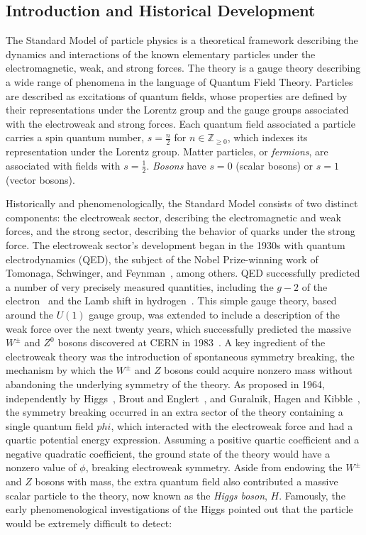 \subsection{Introduction and Historical Development}
The Standard Model of particle physics is a theoretical framework describing the dynamics and interactions of the known elementary particles under the electromagnetic, weak, and strong forces. The theory is a gauge theory describing a wide range of phenomena in the language of Quantum Field Theory. Particles are described as excitations of quantum fields, whose properties are defined by their representations under the Lorentz group and the gauge groups associated with the electroweak and strong forces. Each quantum field associated a particle carries a spin quantum number, $s=\frac{n}{2}$ for $n\in \mathbb{Z}_{\geq0}$, which indexes its representation under the Lorentz group. Matter particles, or \emph{fermions}, are associated with fields with $s=\frac12$. \emph{Bosons} have $s=0$ (scalar bosons) or $s=1$ (vector bosons). 


Historically and phenomenologically, the Standard Model consists of two distinct components: the electroweak sector, describing the electromagnetic and weak forces, and the strong sector, describing the behavior of quarks under the strong force. The electroweak sector's development began in the 1930s with quantum electrodynamics (QED), the subject of the Nobel Prize-winning work of Tomonaga, Schwinger, and Feynman~\cite{QED}, among others. QED successfully predicted a number of very precisely measured quantities, including the $g-2$ of the electron~\cite{g-2} and the Lamb shift in hydrogen~\cite{bethe-lamb}. This simple gauge theory, based around the $U(1)$ gauge group, was extended to include a description of the weak force over the next twenty years, which successfully predicted the massive $W^{\pm}$ and $Z^0$ bosons discovered at CERN in 1983~\cite{WZ-discovery}. A key ingredient of the electroweak theory was the introduction of spontaneous symmetry breaking, the mechanism by which the $W^{\pm}$ and $Z$ bosons could acquire nonzero mass without abandoning the underlying symmetry of the theory. As proposed in 1964, independently by Higgs~\cite{higgs}, Brout and Englert~\cite{brout englert}, and Guralnik, Hagen and Kibble~\cite{ghk}, the symmetry breaking occurred in an extra sector of the theory containing a single quantum field $phi$, which interacted with the electroweak force and had a quartic potential energy expression. Assuming a positive quartic coefficient and a negative quadratic coefficient, the ground state of the theory would have a nonzero value of $\phi$, breaking electroweak symmetry. Aside from endowing the $W^{\pm}$ and $Z$ bosons with mass, the extra quantum field also contributed a massive scalar particle to the theory, now known as the \emph{Higgs boson}, $H$. Famously, the early phenomenological investigations of the Higgs pointed out that the particle would be extremely difficult to detect:

